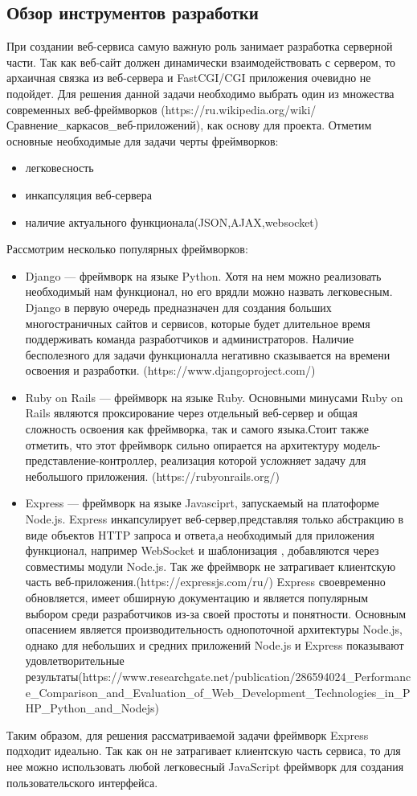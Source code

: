 \subsection{Обзор инструментов разработки}
При создании веб-сервиса самую важную роль занимает разработка серверной части. Так как веб-сайт должен динамически взаимодействовать с сервером, то архаичная связка из веб-сервера и FastCGI/CGI приложения очевидно не подойдет. Для решения данной задачи необходимо выбрать один из множества современных веб-фреймворков (https://ru.wikipedia.org/wiki/Сравнение\_каркасов\_веб-приложений), как основу для проекта. Отметим основные необходимые для задачи черты фреймворков:
 \begin{itemize}
 	\item легковесность
 	\item инкапсуляция веб-сервера
 	\item наличие актуального функционала(JSON,AJAX,websocket)
 \end{itemize}
Рассмотрим несколько популярных фреймворков:
 \begin{itemize}
 	\item Django --- фреймворк на языке Python. Хотя на нем можно реализовать необходимый нам функционал, но его врядли можно назвать легковесным. Django в первую очередь предназначен для создания больших многостраничных сайтов и сервисов, которые будет длительное время поддерживать команда разработчиков и администраторов. Наличие бесполезного для задачи функционалла негативно сказывается на времени освоения и разработки. (https://www.djangoproject.com/)  
 	\item Ruby on Rails --- фреймворк на языке Ruby. Основными минусами Ruby on Rails являются проксирование через отдельный веб-сервер и общая сложность освоения как фреймворка, так и самого языка.Стоит также отметить, что этот фреймворк сильно опирается на архитектуру модель-представление-контроллер, реализация которой усложняет задачу для небольшого приложения.  (https://rubyonrails.org/)  
 	\item Express --- фреймворк на языке Javasciprt, запускаемый на платоформе Node.js. Express  инкапсулирует веб-сервер,представляя только абстракцию в виде объектов HTTP запроса и ответа,а необходимый для приложения функционал, например WebSocket и шаблонизация , добавляются через совместимы модули Node.js. Так же фреймворк не затрагивает клиентскую часть веб-приложения.(https://expressjs.com/ru/) Express своевременно обновляется, имеет обширную документацию и является популярным выбором среди разработчиков из-за своей простоты и понятности. Основным опасением является производительность однопоточной архитектуры Node.js, однако для небольших и средних приложений Node.js и Express показывают удовлетворительные результаты(https://www.researchgate.net/publication/286594024\_Performance\_Comparison\_and\_Evaluation\_of\_Web\_Development\_Technologies\_in\_PHP\_Python\_and\_Nodejs) 
 \end{itemize}
Таким образом, для решения рассматриваемой задачи фреймворк Express подходит идеально. Так как он не затрагивает клиентскую часть сервиса, то для нее можно использовать любой легковесный JavaScript фреймворк для создания пользовательского интерфейса.

